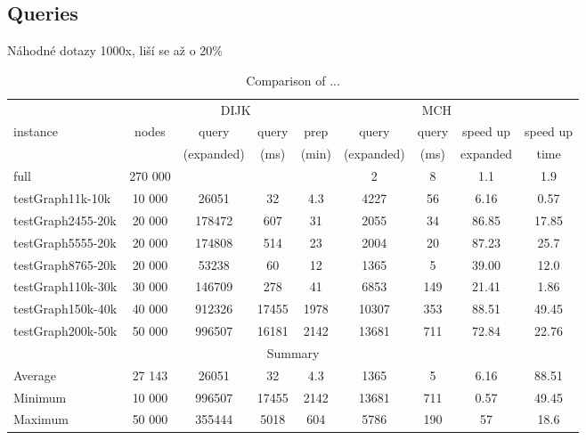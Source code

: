 \subsection{Queries}

Náhodné dotazy 1000x, liší se až o 20\%


\begin{table}
\caption{Comparison of ...}
\label{table1}
\begin{tabular}{l|c|cc|ccccc}
 & & \multicolumn{2}{c}{DIJK} & \multicolumn{5}{c}{MCH} \\ \cline{3-6}
instance & nodes & query & query & prep & query & query & speed up & speed up \\ \hline
& & (expanded) & (ms) & (min) & (expanded) & (ms) & expanded & time \\ \hline
full & 270 000 & & & &  2 & 8 & 1.1 & 1.9 \\ \hline
testGraph11k-10k & 10 000 & 26051 & 32 & 4.3 & 4227 & 56 & 6.16 & 0.57 \\ \hline
testGraph2455-20k & 20 000 & 178472 & 607 & 31 & 2055 & 34 & 86.85 & 17.85 \\ \hline
testGraph5555-20k & 20 000 & 174808 & 514 & 23 & 2004 & 20 & 87.23 & 25.7 \\ \hline
testGraph8765-20k & 20 000 & 53238 & 60 & 12 & 1365 & 5 & 39.00 & 12.0 \\ \hline
testGraph110k-30k & 30 000 & 146709 & 278 & 41 & 6853 & 149 & 21.41 & 1.86 \\ \hline
testGraph150k-40k & 40 000 & 912326 & 17455 & 1978 & 10307 & 353 & 88.51& 49.45 \\ \hline
testGraph200k-50k & 50 000 & 996507 & 16181 & 2142 & 13681 & 711 & 72.84& 22.76 \\ \hline

\multicolumn{9}{c}{Summary} \\ \hline
Average & 27 143 & 26051 & 32 & 4.3 & 1365 & 5 & 6.16 & 88.51 \\ \hline
Minimum & 10 000 & 996507 & 17455 & 2142 & 13681 & 711 & 0.57 & 49.45\\ \hline
Maximum & 50 000 & 355444 & 5018 & 604 & 5786 & 190 & 57 & 18.6 \\ \hline
\end{tabular}
\end{table}



